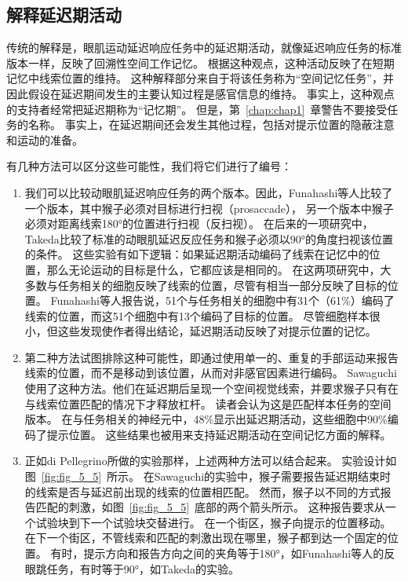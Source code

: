 \subsection{解释延迟期活动}

传统的解释是，眼肌运动延迟响应任务中的延迟期活动，就像延迟响应任务的标准版本一样，反映了回溯性空间工作记忆。
根据这种观点，这种活动反映了在短期记忆中线索位置的维持。
这种解释部分来自于将该任务称为“空间记忆任务”，并因此假设在延迟期间发生的主要认知过程是感官信息的维持。
事实上，这种观点的支持者经常把延迟期称为“记忆期”。
但是，第~\ref{chap:chap1}~章警告不要接受任务的名称。
事实上，在延迟期间还会发生其他过程，包括对提示位置的隐蔽注意和运动的准备。


有几种方法可以区分这些可能性，我们将它们进行了编号：


\begin{enumerate}
	\item 我们可以比较动眼肌延迟响应任务的两个版本。因此，Funahashi等人\cite{funahashi1993prefrontal}比较了一个版本，其中猴子必须对目标进行扫视（prosaccade），
	另一个版本中猴子必须对距离线索180°的位置进行扫视（反扫视）。
	在后来的一项研究中，Takeda\cite{takeda2002prefrontal}比较了标准的动眼肌延迟反应任务和猴子必须以90°的角度扫视该位置的条件。
	这些实验有如下逻辑：如果延迟期活动编码了线索在记忆中的位置，那么无论运动的目标是什么，它都应该是相同的。
	在这两项研究中，大多数与任务相关的细胞反映了线索的位置，尽管有相当一部分反映了目标的位置。
	Funahashi等人报告说，51个与任务相关的细胞中有31个（61\%）编码了线索的位置，而这51个细胞中有13个编码了目标的位置。
	尽管细胞样本很小，但这些发现使作者得出结论，延迟期活动反映了对提示位置的记忆。
	\item 第二种方法试图排除这种可能性，即通过使用单一的、重复的手部运动来报告线索的位置，而不是移动到该位置，从而对非感官因素进行编码。
	Sawaguchi\cite{sawaguchi1999properties}使用了这种方法。他们在延迟期后呈现一个空间视觉线索，并要求猴子只有在与线索位置匹配的情况下才释放杠杆。
	读者会认为这是匹配样本任务的空间版本。
	在与任务相关的神经元中，48\%显示出延迟期活动，这些细胞中90\%编码了提示位置。
	这些结果也被用来支持延迟期活动在空间记忆方面的解释。
	\item 正如di Pellegrino\cite{di1993visuospatial}所做的实验那样，上述两种方法可以结合起来。
	实验设计如图~\ref{fig:fig_5_5}~所示。
	在Sawaguchi\cite{sawaguchi1999properties}的实验中，猴子需要报告延迟期结束时的线索是否与延迟前出现的线索的位置相匹配。
	然而，猴子以不同的方式报告匹配的刺激，如图~\ref{fig:fig_5_5}~底部的两个箭头所示。
	这种报告要求从一个试验块到下一个试验块交替进行。
	在一个街区，猴子向提示的位置移动。
	在下一个街区，不管线索和匹配的刺激出现在哪里，猴子都到达一个固定的位置。
	有时，提示方向和报告方向之间的夹角等于180°，如Funahashi等人\cite{funahashi1993prefrontal}的反眼跳任务，有时等于90°，如Takeda\cite{takeda2002prefrontal}的实验。
	

\end{enumerate}
